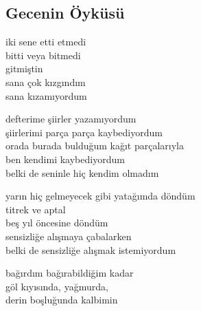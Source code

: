 \subsection{Gecenin Öyküsü}

iki sene etti etmedi \\
bitti veya bitmedi \\
gitmiştin \\
sana çok kızgındım \\
sana kızamıyordum

\noindent\newline
defterime şiirler yazamıyordum \\
şiirlerimi parça parça kaybediyordum \\
orada burada bulduğum kağıt parçalarıyla \\
ben kendimi kaybediyordum \\
belki de seninle hiç kendim olmadım

\noindent\newline
yarın hiç gelmeyecek gibi yatağımda döndüm \\
titrek ve aptal \\
beş yıl öncesine döndüm \\
sensizliğe alışmaya çabalarken \\
belki de sensizliğe alışmak istemiyordum

\noindent\newline
bağırdım bağırabildiğim kadar \\
göl kıyısında, yağmurda, \\
derin boşluğunda kalbimin